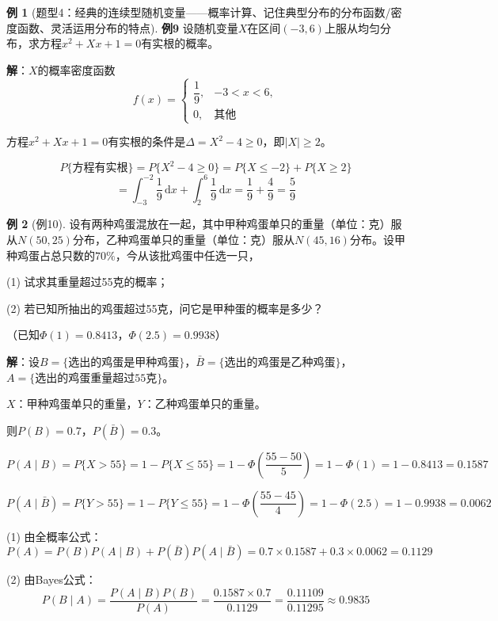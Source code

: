 \documentclass[11pt,a4paper]{report}
\theoremstyle{definition}
\newtheorem{example}{例}[chapter]
\theoremstyle{plain}
\begin{document}
\begin{example}[题型4：经典的连续型随机变量——概率计算、记住典型分布的分布函数/密度函数、灵活运用分布的特点]

\textbf{例9} 设随机变量\(X\)在区间\((-3,6)\)上服从均匀分布，求方程\(x^2+Xx+1=0\)有实根的概率。

\textbf{解}：\(X\)的概率密度函数
\[
f(x)=\begin{cases}
\dfrac{1}{9}, & -3<x<6, \\[10pt]
0, & \text{其他}
\end{cases}
\]

方程\(x^2+Xx+1=0\)有实根的条件是\(\Delta=X^2-4\geq 0\)，即\(|X|\geq 2\)。

\[
P\{\text{方程有实根}\}=P\{X^2-4\geq 0\}=P\{X\leq -2\}+P\{X\geq 2\}
\]
\[
=\int_{-3}^{-2}\frac{1}{9}\,\mathrm{d}x+\int_{2}^{6}\frac{1}{9}\,\mathrm{d}x=\frac{1}{9}+\frac{4}{9}=\frac{5}{9}
\]
\end{example}

\begin{example}[例10]
设有两种鸡蛋混放在一起，其中甲种鸡蛋单只的重量（单位：克）服从\(N(50,25)\)分布，乙种鸡蛋单只的重量（单位：克）服从\(N(45,16)\)分布。设甲种鸡蛋占总只数的\(70\%\)，今从该批鸡蛋中任选一只，

(1) 试求其重量超过55克的概率；

(2) 若已知所抽出的鸡蛋超过55克，问它是甲种蛋的概率是多少？

（已知\(\Phi(1)=0.8413\)，\(\Phi(2.5)=0.9938\)）

\textbf{解}：设\(B=\{\text{选出的鸡蛋是甲种鸡蛋}\}\)，\(\bar{B}=\{\text{选出的鸡蛋是乙种鸡蛋}\}\)，\(A=\{\text{选出的鸡蛋重量超过55克}\}\)。

\(X\)：甲种鸡蛋单只的重量，\(Y\)：乙种鸡蛋单只的重量。

则\(P(B)=0.7\)，\(P(\bar{B})=0.3\)。

\[
P(A\mid B)=P\{X>55\}=1-P\{X\leq 55\}=1-\Phi\left(\frac{55-50}{5}\right)=1-\Phi(1)=1-0.8413=0.1587
\]

\[
P(A\mid\bar{B})=P\{Y>55\}=1-P\{Y\leq 55\}=1-\Phi\left(\frac{55-45}{4}\right)=1-\Phi(2.5)=1-0.9938=0.0062
\]

(1) 由全概率公式：
\[
P(A)=P(B)P(A\mid B)+P(\bar{B})P(A\mid\bar{B})=0.7\times 0.1587+0.3\times 0.0062=0.1129
\]

(2) 由Bayes公式：
\[
P(B\mid A)=\frac{P(A\mid B)P(B)}{P(A)}=\frac{0.1587\times 0.7}{0.1129}=\frac{0.11109}{0.11295}\approx 0.9835
\]
\end{example}

\newpage
\end{document}
